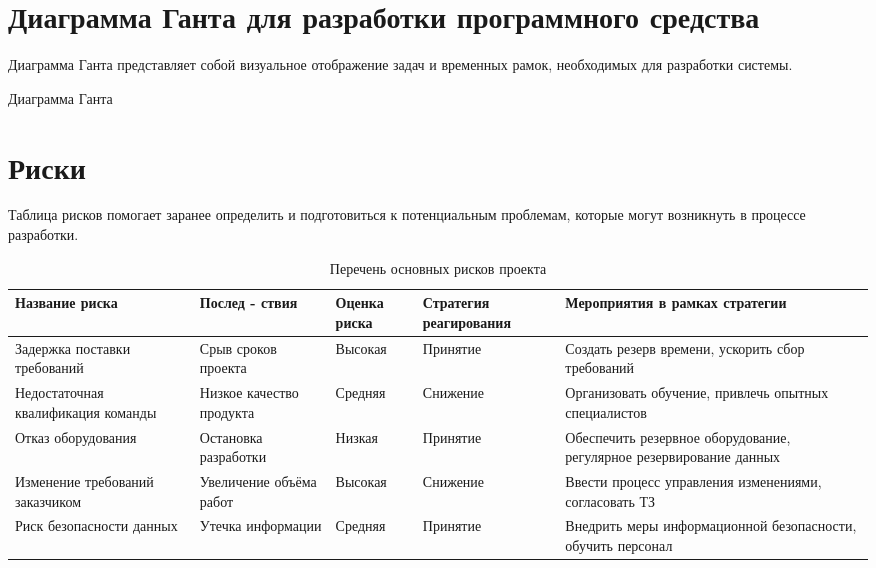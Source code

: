 \section{Диаграмма Ганта для разработки программного средства}

Диаграмма Ганта представляет собой визуальное отображение задач
и временных рамок, необходимых для разработки системы.


\begin{image}
    \caption{Диаграмма Ганта}
    \label{fig:use:case}
\end{image}


\clearpage

\section{Риски}

Таблица рисков помогает заранее определить
и подготовиться к потенциальным проблемам,
которые могут возникнуть в процессе разработки.

\begin{table}[h]
    \centering
    \caption{Перечень основных рисков проекта}
    \label{tab:risk_table}
    \begin{tabular}{|p{3cm}|p{2.5cm}|p{2.5cm}|p{3cm}|p{4cm}|}
        \hline
        \textbf{Название риска} & \textbf{Послед - ствия} & \textbf{Оценка риска} & \textbf{Стратегия реагирования} & \textbf{Мероприятия в рамках стратегии} \\ \hline
        Задержка поставки требований & Срыв сроков проекта & Высокая & Принятие & Создать резерв времени, ускорить сбор требований \\ \hline
        Недостаточная квалификация команды & Низкое качество продукта & Средняя & Снижение & Организовать обучение, привлечь опытных специалистов \\ \hline
        Отказ оборудования & Остановка разработки & Низкая & Принятие & Обеспечить резервное оборудование, регулярное резервирование данных \\ \hline
        Изменение требований заказчиком & Увеличение объёма работ & Высокая & Снижение & Ввести процесс управления изменениями, согласовать ТЗ \\ \hline
        Риск безопасности данных & Утечка информации & Средняя & Принятие & Внедрить меры информационной безопасности, обучить персонал \\ \hline
    \end{tabular}
\end{table}
\clearpage
